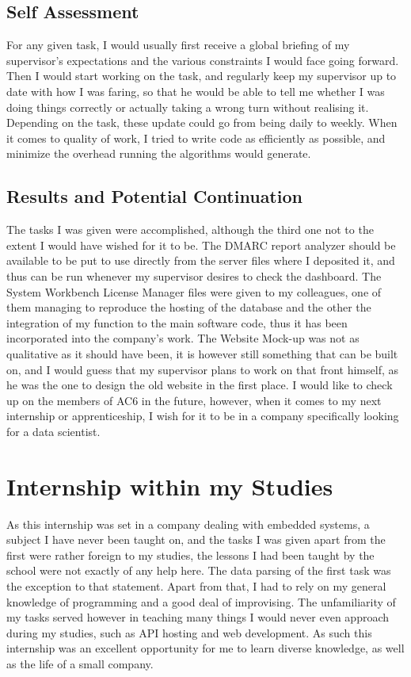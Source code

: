 \documentclass[12pt]{article}
\begin{document}
\subsection{Self Assessment}

For any given task, I would usually first receive a global briefing of my supervisor's expectations and the various constraints I would face going forward. Then I would start working on the task, and regularly keep my supervisor up to date with how I was faring, so that he would be able to tell me whether I was doing things correctly or actually taking a wrong turn without realising it. Depending on the task, these update could go from being daily to weekly. When it comes to quality of work, I tried to write code as efficiently as possible, and minimize the overhead running the algorithms would generate. 

\subsection{Results and Potential Continuation}

The tasks I was given were accomplished, although the third one not to the extent I would have wished for it to be. The DMARC report analyzer should be available to be put to use directly from the server files where I deposited it, and thus can be run whenever my supervisor desires to check the dashboard. The System Workbench License Manager files were given to my colleagues, one of them managing to reproduce the hosting of the database and the other the integration of my function to the main software code, thus it has been incorporated into the company's work. The Website Mock-up was not as qualitative as it should have been, it is however still something that can be built on, and I would guess that my supervisor plans to work on that front himself, as he was the one to design the old website in the first place. I would like to check up on the members of AC6 in the future, however, when it comes to my next internship or apprenticeship, I wish for it to be in a company specifically looking for a data scientist.

\section{Internship within my Studies}

As this internship was set in a company dealing with embedded systems, a subject I have never been taught on, and the tasks I was given apart from the first were rather foreign to my studies, the lessons I had been taught by the school were not exactly of any help here. The data parsing of the first task was the exception to that statement. Apart from that, I had to rely on my general knowledge of programming and a good deal of improvising. The unfamiliarity of my tasks served however in teaching many things I would never even approach during my studies, such as API hosting and web development. As such this internship was an excellent opportunity for me to learn diverse knowledge, as well as the life of a small company.
\end{document}
